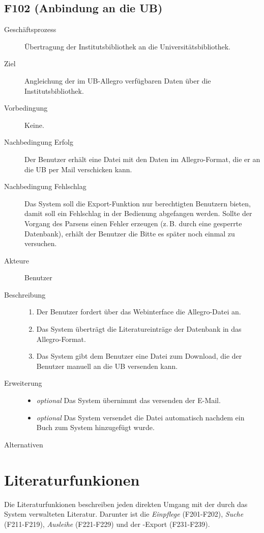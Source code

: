 \subsection{F102 (Anbindung an die UB)}
\begin{description}
  \item[Geschäftsprozess]Übertragung der Institutsbibliothek an die Universitätsbibliothek.
  \item[Ziel]Angleichung der im UB-Allegro verfügbaren Daten über die Institutsbibliothek.
  \item[Vorbedingung]Keine.
  \item[Nachbedingung Erfolg]Der Benutzer erhält eine Datei mit den Daten im Allegro-Format, die er an die UB per Mail verschicken kann.
  \item[Nachbedingung Fehlschlag]Das System soll die Export-Funktion nur berechtigten Benutzern bieten, damit soll ein Fehlschlag in der Bedienung abgefangen werden. Sollte der Vorgang des Parsens einen Fehler erzeugen (z.\,B. durch eine gesperrte Datenbank), erhält der Benutzer die Bitte es später noch einmal zu versuchen.
  \item[Akteure]Benutzer
  \item[Beschreibung]
    \begin{enumerate}
      \item Der Benutzer fordert über das Webinterface die Allegro-Datei an.
      \item Das System überträgt die Literatureinträge der Datenbank in das Allegro-Format.
      \item Das System gibt dem Benutzer eine Datei zum Download, die der Benutzer manuell an die UB versenden kann.
    \end{enumerate}
  \item[Erweiterung]
    \begin{itemize}
      \item \emph{optional} Das System übernimmt das versenden der E-Mail.
      \item \emph{optional} Das System versendet die Datei automatisch nachdem ein Buch zum System hinzugefügt wurde.
    \end{itemize}
  \item[Alternativen]
\end{description}



\section{Literaturfunkionen}
Die Literaturfunkionen beschreiben jeden direkten Umgang mit der durch das System verwalteten Literatur. Darunter ist die \emph{Einpflege} (F201-F202), \emph{Suche} (F211-F219), \emph{Ausleihe} (F221-F229) und der \BibTeX -Export (F231-F239).
